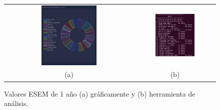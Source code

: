 \documentclass[a4paper, 12pt]{book}
\begin{document}
\begin{figure}[!h]
    \centering
    \begin{tabular}{cc}
    \includegraphics[width=0.45\textwidth]{img/esem_1_year_graph.png} &  
    \includegraphics[width=0.52\textwidth]{img/esem_1_year.png} \\ 
    (a) &(b) 
    \end{tabular}
    \caption{Valores ESEM de 1 año (a) gráficamente y (b) herramienta de análisis.}
    \label{fig:comp_esem_1_year}
\end{figure}
\end{document}

